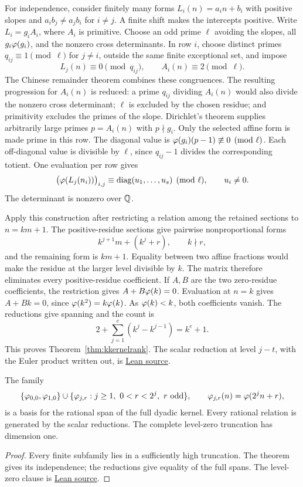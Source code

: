 \documentclass[11pt]{article}
\begin{document}
For independence, consider finitely many forms $L_i(n)=a_in+b_i$ with
positive slopes and $a_ib_j\ne a_jb_i$ for $i\ne j$. A finite shift makes
the intercepts positive. Write $L_i=g_iA_i$, where $A_i$ is primitive.
Choose an odd prime $\ell$ avoiding the slopes, all $g_i\varphi(g_i)$, and the
nonzero cross determinants. In row $i$, choose distinct primes
$q_{ij}\equiv1\pmod\ell$ for $j\ne i$, outside the same finite exceptional
set, and impose
\[
 L_j(n)\equiv0\pmod{q_{ij}},\qquad A_i(n)\equiv2\pmod\ell.
\]
The Chinese remainder theorem combines these congruences. The resulting
progression for $A_i(n)$ is reduced: a prime $q_{ij}$ dividing $A_i(n)$
would also divide the nonzero cross determinant; $\ell$ is excluded by the
chosen residue; and primitivity excludes the primes of the slope.
Dirichlet's theorem supplies arbitrarily large primes $p=A_i(n)$ with
$p\nmid g_i$. Only the selected affine form is made prime in this row.
The diagonal value is
$\varphi(g_i)(p-1)\not\equiv0\pmod\ell$. Each off-diagonal value is divisible
by $\ell$, since $q_{ij}-1$ divides the corresponding totient.
One evaluation per row gives
\[
 \bigl(\varphi(L_j(n_i))\bigr)_{i,j}
 \equiv\operatorname{diag}(u_1,\ldots,u_s)\pmod\ell,
 \qquad u_i\ne0.
\]
The determinant is nonzero over $\mathbb{Q}$.

Apply this construction after restricting a relation among the retained
sections to $n=km+1$. The positive-residue sections give pairwise
nonproportional forms
\[
 k^{j+1}m+(k^j+r),\qquad k\nmid r,
\]
and the remaining form is $km+1$. Equality between two affine fractions
would make the residue at the larger level divisible by $k$. The matrix
therefore eliminates every positive-residue coefficient. If $A,B$ are the
two zero-residue coefficients, the restriction gives
$A+B\varphi(k)=0$. Evaluation at $n=k$ gives $A+Bk=0$, since
$\varphi(k^2)=k\varphi(k)$. As $\varphi(k)<k$, both coefficients vanish.
The reductions give spanning and the count is
\[
 2+\sum_{j=1}^e(k^j-k^{j-1})=k^e+1.
\]
This proves Theorem~\ref{thm:kkernelrank}. The scalar reduction at level
$j-t$, with the Euler product written out, is
\href{https://github.com/wcook04/plectis-erdos/blob/f36a98bf3d3e6f65f1074e3b800e3293d5b8a51a/ErdosProblems/Erdos249/PaperCompleteR7/KernelIntegral.lean#L226}{Lean source}.

\begin{corollary}\label{res:basis}
The family
\[
 \{\varphi_{0,0},\varphi_{1,0}\}
 \cup\{\varphi_{j,r}:j\ge1,\ 0<r<2^j,\ r\text{ odd}\},
 \qquad \varphi_{j,r}(n)=\varphi(2^jn+r),
\]
is a basis for the rational span of the full dyadic kernel. Every rational
relation is generated by the scalar reductions. The complete level-zero
truncation has dimension one.
\end{corollary}
\begin{proof}
Every finite subfamily lies in a sufficiently high truncation. The theorem
gives its independence; the reductions give equality of the full spans.
The level-zero clause is
\href{https://github.com/wcook04/plectis-erdos/blob/f36a98bf3d3e6f65f1074e3b800e3293d5b8a51a/ErdosProblems/Erdos249/PaperCompleteR7/ArithmeticAssemblies.lean#L112}{Lean source}.
\end{proof}
\end{document}
